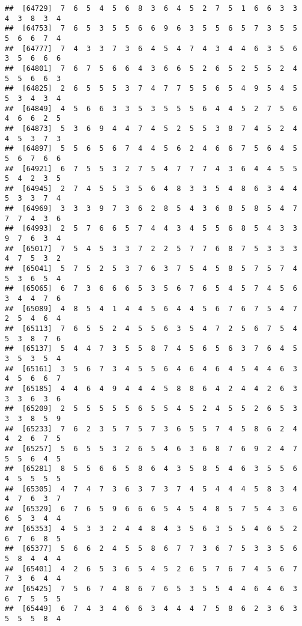 \documentclass[
]{book}
\begin{document}
\begin{verbatim}
##  [64729]  7  6  5  4  5  6  8  3  6  4  5  2  7  5  1  6  6  3  3  4  3  8  3  4
##  [64753]  7  6  5  3  5  5  6  6  9  6  3  5  5  6  5  7  3  5  5  5  6  6  7  4
##  [64777]  7  4  3  3  7  3  6  4  5  4  7  4  3  4  4  6  3  5  6  3  5  6  6  6
##  [64801]  7  6  7  5  6  6  4  3  6  6  5  2  6  5  2  5  5  2  4  5  5  6  6  3
##  [64825]  2  6  5  5  5  3  7  4  7  7  5  5  6  5  4  9  5  4  5  5  3  4  3  4
##  [64849]  4  5  6  6  3  3  5  3  5  5  5  6  4  4  5  2  7  5  6  4  6  6  2  5
##  [64873]  5  3  6  9  4  4  7  4  5  2  5  5  3  8  7  4  5  2  4  4  5  3  7  3
##  [64897]  5  5  6  5  6  7  4  4  5  6  2  4  6  6  7  5  6  4  5  5  6  7  6  6
##  [64921]  6  7  5  5  3  2  7  5  4  7  7  7  4  3  6  4  4  5  5  5  4  2  3  5
##  [64945]  2  7  4  5  5  3  5  6  4  8  3  3  5  4  8  6  3  4  4  5  3  3  7  4
##  [64969]  3  3  3  9  7  3  6  2  8  5  4  3  6  8  5  8  5  4  7  7  7  4  3  6
##  [64993]  2  5  7  6  6  5  7  4  4  3  4  5  5  6  8  5  4  3  3  9  7  6  3  4
##  [65017]  7  5  4  5  3  3  7  2  2  5  7  7  6  8  7  5  3  3  3  4  7  5  3  2
##  [65041]  5  7  5  2  5  3  7  6  3  7  5  4  5  8  5  7  5  7  4  5  3  6  5  4
##  [65065]  6  7  3  6  6  6  5  3  5  6  7  6  5  4  5  7  4  5  6  3  4  4  7  6
##  [65089]  4  8  5  4  1  4  4  5  6  4  4  5  6  7  6  7  5  4  7  2  5  4  6  4
##  [65113]  7  6  5  5  2  4  5  5  6  3  5  4  7  2  5  6  7  5  4  5  3  8  7  6
##  [65137]  5  4  4  7  3  5  5  8  7  4  5  6  5  6  3  7  6  4  5  3  5  3  5  4
##  [65161]  3  5  6  7  3  4  5  5  6  4  6  4  6  4  5  4  4  6  3  4  5  6  6  7
##  [65185]  4  4  6  4  9  4  4  4  5  8  8  6  4  2  4  4  2  6  3  3  3  6  3  6
##  [65209]  2  5  5  5  5  5  6  5  5  4  5  2  4  5  5  2  6  5  3  3  3  8  5  9
##  [65233]  7  6  2  3  5  7  5  7  3  6  5  5  7  4  5  8  6  2  4  4  2  6  7  5
##  [65257]  5  6  5  5  3  2  6  5  4  6  3  6  8  7  6  9  2  4  7  5  5  6  4  5
##  [65281]  8  5  5  6  6  5  8  6  4  3  5  8  5  4  6  3  5  5  6  4  5  5  5  5
##  [65305]  4  7  4  7  3  6  3  7  3  7  4  5  4  4  4  5  8  3  4  4  7  6  3  7
##  [65329]  6  7  6  5  9  6  6  6  5  4  5  4  8  5  7  5  4  3  6  6  5  3  4  4
##  [65353]  4  5  3  3  2  4  4  8  4  3  5  6  3  5  5  4  6  5  2  6  7  6  8  5
##  [65377]  5  6  6  2  4  5  5  8  6  7  7  3  6  7  5  3  3  5  6  5  8  4  4  4
##  [65401]  4  2  6  5  3  6  5  4  5  2  6  5  7  6  7  4  5  6  7  7  3  6  4  4
##  [65425]  7  5  6  7  4  8  6  7  6  5  3  5  5  4  4  6  4  6  3  6  7  5  5  5
##  [65449]  6  7  4  3  4  6  6  3  4  4  4  7  5  8  6  2  3  6  3  5  5  5  8  4

\end{verbatim}
\end{document}
